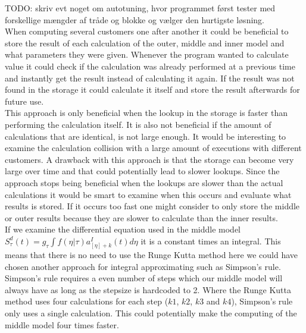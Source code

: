 
TODO: skriv evt noget om autotuning, hvor programmet først tester med forskellige mængder af tråde og blokke og vælger den hurtigste løsning. \\



When computing several customers one after another it could be beneficial to store the result of each calculation of the outer, middle and inner model and what parameters they were given. Whenever the program wanted to calculate value it could check if the calculation was already performed at a previous time and instantly get the result instead of calculating it again. If the result was not found in the storage it could calculate it itself and store the result afterwards for future use. \\ 

This approach is only beneficial when the lookup in the storage is faster than performing the calculation itself. It is also not beneficial if the amount of calculations that are identical, is not large enough. It would be interesting to examine the calculation collision with a large amount of executions with different customers. A drawback with this approach is that the storage can become very large over time and that could potentially lead to slower lookups. Since the approach stops being beneficial when the lookups are slower than the actual calculations it would be smart to examine when this occurs and evaluate what results is stored. If it occurs too fast one might consider to only store the middle or outer results because they are slower to calculate than the inner results. \\

If we examine the differential equation used in the middle model \\$S_\tau^d(t) = g_\tau \int f(\eta|\tau)a_{[\eta] + k}^I(t)d\eta$ it is a constant times an integral. This means that there is no need to use the Runge Kutta method here we could have chosen another approach for integral approximating such as Simpson's rule\cite{simp}. Simpson's rule requires a even number of steps which our middle model will always have as long as the stepsize is hardcoded to 2. Where the Runge Kutta method uses four calculations for each step ($k1$, $k2$, $k3$ and $k4$), Simpson's rule only uses a single calculation. This could potentially make the computing of the middle model four times faster. 
